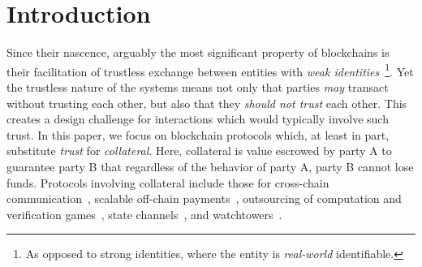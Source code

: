 \documentclass[runningheads]{llncs}
\newcommand{\dom}[1]{\todo[linecolor=green,backgroundcolor=green!25,bordercolor=green,inline,caption={}]{Comment by Dominik: #1}}
\begin{document}
\section{Introduction}
\label{sec:intro}


Since their nascence, arguably the most significant property of blockchains is their facilitation of trustless exchange between entities with \emph{weak identities}~\footnote{As opposed to strong identities, where the entity is \textit{real-world} identifiable.}.
Yet the trustless nature of the systems means not only that parties \textit{may} transact without trusting each other, but also that they \textit{should not trust} each other.
This creates a design challenge for interactions which would typically involve such trust. 
In this paper, we focus on blockchain protocols which, at least in part, substitute \textit{trust} for \textit{collateral}.
Here, collateral is value escrowed by party A to guarantee party B that regardless of the behavior of party A, party B cannot lose funds. 
Protocols involving collateral include those for cross-chain communication~\cite{Zamyatin2019XCLAIM}, scalable off-chain payments~\cite{Khalil2019NOCUST}, outsourcing of computation and verification games~\cite{teutsch2017scalable}, state channels~\cite{dziembowski2018general,avarikioti2019brick}, and watchtowers~\cite{poon2016bitcoin,mccorry2018pisa,avarikioti2018towards}.
\end{document}
